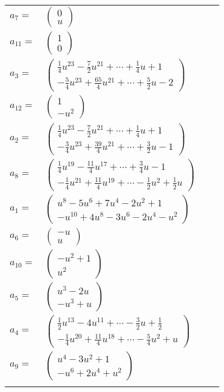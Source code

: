 \documentclass[1p]{elsarticle_modified}
\theoremstyle{definition}
\begin{document}
\begin{tabular}{m{7pt} m{180pt} m{7pt} m{180pt} }
\flushright $a_{7}=$&$\begin{pmatrix}0\\u\end{pmatrix}$ \\
\flushright $a_{11}=$&$\begin{pmatrix}1\\0\end{pmatrix}$ \\
\flushright $a_{3}=$&$\begin{pmatrix}\frac{1}{4} u^{23}-\frac{7}{2} u^{21}+\cdots+\frac{1}{4} u+1\\-\frac{5}{4} u^{23}+\frac{65}{4} u^{21}+\cdots+\frac{5}{2} u-2\end{pmatrix}$ \\
\flushright $a_{12}=$&$\begin{pmatrix}1\\- u^2\end{pmatrix}$ \\
\flushright $a_{2}=$&$\begin{pmatrix}\frac{1}{4} u^{23}-\frac{7}{2} u^{21}+\cdots+\frac{1}{4} u+1\\-\frac{3}{4} u^{23}+\frac{39}{4} u^{21}+\cdots+\frac{3}{2} u-1\end{pmatrix}$ \\
\flushright $a_{8}=$&$\begin{pmatrix}\frac{1}{4} u^{19}-\frac{11}{4} u^{17}+\cdots+\frac{3}{4} u-1\\-\frac{1}{4} u^{21}+\frac{11}{4} u^{19}+\cdots-\frac{1}{2} u^2+\frac{1}{2} u\end{pmatrix}$ \\
\flushright $a_{1}=$&$\begin{pmatrix}u^8-5 u^6+7 u^4-2 u^2+1\\- u^{10}+4 u^8-3 u^6-2 u^4- u^2\end{pmatrix}$ \\
\flushright $a_{6}=$&$\begin{pmatrix}- u\\u\end{pmatrix}$ \\
\flushright $a_{10}=$&$\begin{pmatrix}- u^2+1\\u^2\end{pmatrix}$ \\
\flushright $a_{5}=$&$\begin{pmatrix}u^3-2 u\\- u^3+u\end{pmatrix}$ \\
\flushright $a_{4}=$&$\begin{pmatrix}\frac{1}{2} u^{13}-4 u^{11}+\cdots-\frac{3}{2} u+\frac{1}{2}\\-\frac{1}{4} u^{20}+\frac{11}{4} u^{18}+\cdots-\frac{5}{4} u^2+u\end{pmatrix}$ \\
\flushright $a_{9}=$&$\begin{pmatrix}u^4-3 u^2+1\\- u^6+2 u^4+u^2\end{pmatrix}$\\&\end{tabular}
\end{document}
